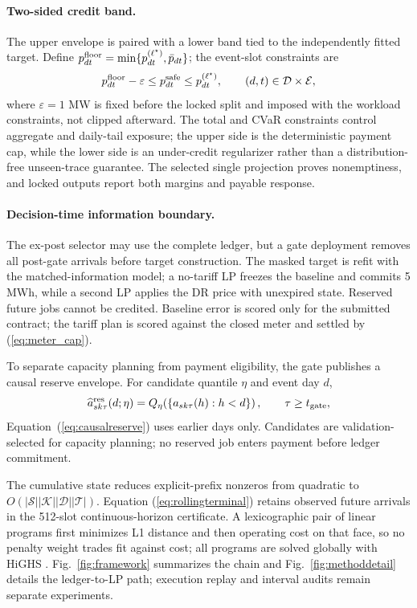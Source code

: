 \documentclass[10pt,journal]{IEEEtran}
\begin{document}
\paragraph{Two-sided credit band.}
The upper envelope is paired with a lower band tied to the independently fitted
target. Define \(p^{\rm floor}_{dt}=\min\{p^{(\ell^\star)}_{dt},\bar p_{dt}\}\);
the event-slot constraints are
\begin{equation}
 p^{\rm floor}_{dt}-\varepsilon
 \leq p^{\rm safe}_{dt}\leq p^{(\ell^\star)}_{dt},
 \qquad (d,t)\in\mathcal D\times\mathcal E,
 \label{eq:twosided}
\end{equation}
where $\varepsilon=1$ MW is fixed before the locked split and imposed with the
workload constraints, not clipped afterward. The total and CVaR constraints
control aggregate and daily-tail exposure; the upper side is the deterministic
payment cap, while the lower side is an under-credit regularizer rather than a
distribution-free unseen-trace guarantee. The selected single projection proves
nonemptiness, and locked outputs report both margins and payable response.

\paragraph{Decision-time information boundary.}
The ex-post selector may use the complete ledger, but a gate deployment removes
all post-gate arrivals before target construction. The masked target is refit
with the matched-information model; a no-tariff LP freezes the baseline and
commits 5 MWh, while a second LP applies the DR price with unexpired state.
Reserved future jobs cannot be credited. Baseline error is scored only for the
submitted contract; the tariff plan is scored against the closed meter and
settled by (\ref{eq:meter_cap}).

To separate capacity planning from payment eligibility, the gate publishes a
causal reserve envelope. For candidate quantile $\eta$ and event day $d$,
\begin{equation}
 \widehat a^{\rm res}_{sk\tau}(d;\eta)=Q_{\eta}\!\left(\left\{a_{sk\tau}(h):h<d\right\}\right),
 \qquad \tau\geq t_{\rm gate},
\label{eq:causalreserve}
\end{equation}
Equation~(\ref{eq:causalreserve}) uses earlier days only. Candidates are
validation-selected for capacity planning; no reserved job enters payment
before ledger commitment.

The cumulative state reduces explicit-prefix nonzeros from quadratic to
$O(|\mathcal S||\mathcal K||\mathcal D||\mathcal T|)$. Equation
(\ref{eq:rollingterminal}) retains observed future arrivals in the 512-slot
continuous-horizon certificate. A lexicographic pair of linear programs first
minimizes L1 distance and then operating cost on that face, so no penalty
weight trades fit against cost; all programs are solved globally with HiGHS
\cite{huangfu2018highs}. Fig.~\ref{fig:framework} summarizes the chain and
Fig.~\ref{fig:methoddetail} details the ledger-to-LP path; execution replay and
interval audits remain separate experiments.
\end{document}
